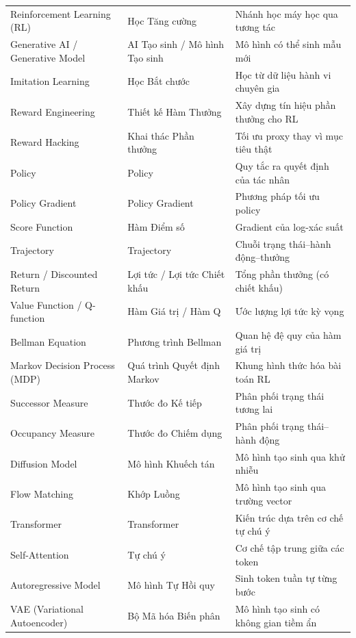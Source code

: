 \documentclass[12pt,a4paper]{article}
\begin{document}
\begin{center}
\begin{longtable}{p{5cm} p{4.5cm} p{4.5cm}}
    Reinforcement Learning (RL) & Học Tăng cường & Nhánh học máy học qua tương tác \\
    Generative AI / Generative Model & AI Tạo sinh / Mô hình Tạo sinh & Mô hình có thể sinh mẫu mới \\
    Imitation Learning & Học Bắt chước & Học từ dữ liệu hành vi chuyên gia \\
    Reward Engineering & Thiết kế Hàm Thưởng & Xây dựng tín hiệu phần thưởng cho RL \\
    Reward Hacking & Khai thác Phần thưởng & Tối ưu proxy thay vì mục tiêu thật \\
    Policy & Policy & Quy tắc ra quyết định của tác nhân \\
    Policy Gradient & Policy Gradient & Phương pháp tối ưu policy \\
    Score Function & Hàm Điểm số & Gradient của log-xác suất \\
    Trajectory & Trajectory & Chuỗi trạng thái--hành động--thưởng \\
    Return / Discounted Return & Lợi tức / Lợi tức Chiết khấu & Tổng phần thưởng (có chiết khấu) \\
    Value Function / Q-function & Hàm Giá trị / Hàm Q & Ước lượng lợi tức kỳ vọng \\
    Bellman Equation & Phương trình Bellman & Quan hệ đệ quy của hàm giá trị \\
    Markov Decision Process (MDP) & Quá trình Quyết định Markov & Khung hình thức hóa bài toán RL \\
    Successor Measure & Thước đo Kế tiếp & Phân phối trạng thái tương lai \\
    Occupancy Measure & Thước đo Chiếm dụng & Phân phối trạng thái--hành động \\
    Diffusion Model & Mô hình Khuếch tán & Mô hình tạo sinh qua khử nhiễu \\
    Flow Matching & Khớp Luồng & Mô hình tạo sinh qua trường vector \\
    Transformer & Transformer & Kiến trúc dựa trên cơ chế tự chú ý \\
    Self-Attention & Tự chú ý & Cơ chế tập trung giữa các token \\
    Autoregressive Model & Mô hình Tự Hồi quy & Sinh token tuần tự từng bước \\
    VAE (Variational Autoencoder) & Bộ Mã hóa Biến phân & Mô hình tạo sinh có không gian tiềm ẩn \\

\end{longtable}
\end{center}
\end{document}
